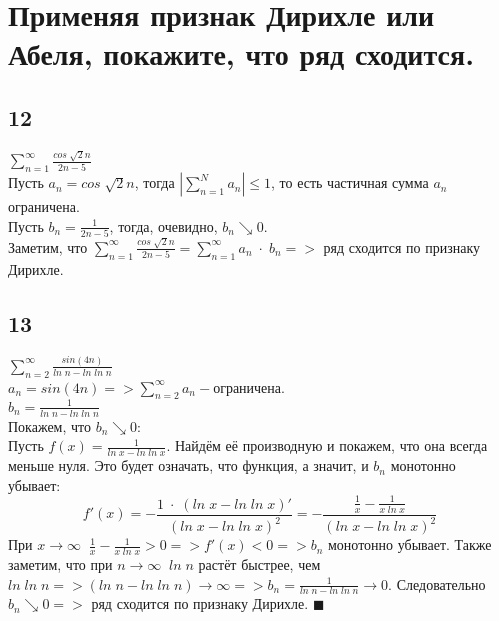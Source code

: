 \documentclass[a4paper,fleqn]{article}
\begin{document}


    
    \section*{Применяя признак Дирихле или Абеля, покажите, что ряд сходится.}
    \subsection*{12}
    $\displaystyle \sum\limits_{n = 1}^{\infty} \frac{cos \; \sqrt{2}n}{2n - 5}$ \\
    Пусть $\displaystyle a_n = cos \; \sqrt{2}n$, тогда $\left| \sum\limits_{n = 1}^N a_n \right| \leq 1$, то есть частичная сумма $\displaystyle a_n$ ограничена. \\
    Пусть $\displaystyle b_n = \frac{1}{2n - 5}$, тогда, очевидно, $b_n \searrow 0$. \\
    Заметим, что $\displaystyle \sum\limits_{n = 1}^{\infty} \frac{cos \; \sqrt{2}n}{2n - 5} = \sum\limits_{n = 1}^{\infty} a_n \; \cdot \; b_n =>$ ряд сходится по признаку Дирихле. \\ 

    \subsection*{13}
    $\displaystyle \sum\limits_{n = 2}^{\infty} \frac{sin(4n)}{ln \; n - ln \; ln \; n}$ \\
    $\displaystyle a_n = sin(4n) => \sum\limits_{n = 2}^{\infty} a_n - \text{ограничена}$. \\
    $\displaystyle b_n = \frac{1}{ln \; n - ln \; ln \; n}$ \\
    Покажем, что $\displaystyle b_n \searrow 0$: \\
    Пусть $\displaystyle f(x) = \frac{1}{ln \; x - ln \; ln \; x}$. Найдём её производную и покажем, что она всегда меньше нуля. Это будет означать, что функция, а значит, и $\displaystyle b_n$ монотонно убывает: \\
    \begin{equation*} f'(x) = -\frac{1 \; \cdot \; (ln \; x - ln \; ln \; x)'}{(ln \; x - ln \; ln \; x)^2} = -\frac{\frac{1}{x} - \frac{1}{x\; ln \; x}}{(ln \; x - ln \; ln \; x)^2} \end{equation*}
    При $\displaystyle x \rightarrow \infty \; \; \frac{1}{x} - \frac{1}{x\; ln \; x} > 0 => f'(x) < 0 => b_n$ монотонно убывает. Также заметим, что при $\displaystyle n \rightarrow \infty \; \; ln \; n$ растёт быстрее, чем $ln\; ln\; n => (ln \; n - ln \; ln \; n) \rightarrow \infty => b_n = \frac{1}{ln \; n - ln \; ln \; n} \rightarrow 0$. Следовательно $\displaystyle b_n \searrow 0 =>$ ряд сходится по признаку Дирихле. $\displaystyle \blacksquare$ \\
\end{document}

